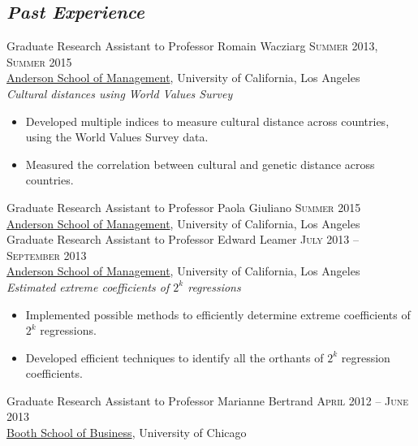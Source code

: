 \documentclass[11pt]{article}
\begin{document}
\subsection{\textbf{\emph{Past Experience}}}
\label{sec-2-2}
\flushleft
Graduate Research Assistant to Professor Romain Wacziarg \hfill
\textsc{\normalsize Summer 2013, Summer 2015}\\
\href{http://www.anderson.ucla.edu/faculty/global-economics-and-management/phd-program}{Anderson School of Management}, University of California, Los Angeles \\
\emph{Cultural distances using World Values Survey}
\begin{itemize}
\item Developed multiple indices to measure cultural distance across countries, using the World Values Survey data.
\item Measured the correlation between cultural and genetic distance across countries.
\end{itemize}
\vspace{0.5em}
Graduate Research Assistant to Professor Paola Giuliano \hfill
\textsc{\normalsize Summer 2015}\\
\href{http://www.anderson.ucla.edu/faculty/global-economics-and-management/phd-program}{Anderson School of Management}, University of California, Los Angeles \\
\vspace{0.5em}
Graduate Research Assistant to Professor Edward Leamer \hfill
\textsc{\normalsize July 2013 -- September 2013}\\
\href{http://www.anderson.ucla.edu/faculty/global-economics-and-management/phd-program}{Anderson School of Management}, University of California, Los Angeles \\
\emph{Estimated extreme coefficients of $2^k$ regressions}
\begin{itemize}
\item Implemented possible methods to efficiently determine extreme coefficients of $2^k$ regressions.
\item Developed efficient techniques to identify all the orthants of $2^k$ regression coefficients.
\end{itemize}
\vspace{0.5em}
Graduate Research Assistant to Professor Marianne Bertrand \hfill
\textsc{\normalsize April 2012 -- June 2013}\\
\href{http://www.chicagobooth.edu/faculty/bio.aspx?person_id\%3D12824551424}{Booth School of Business}, University of Chicago \\
\end{document}
